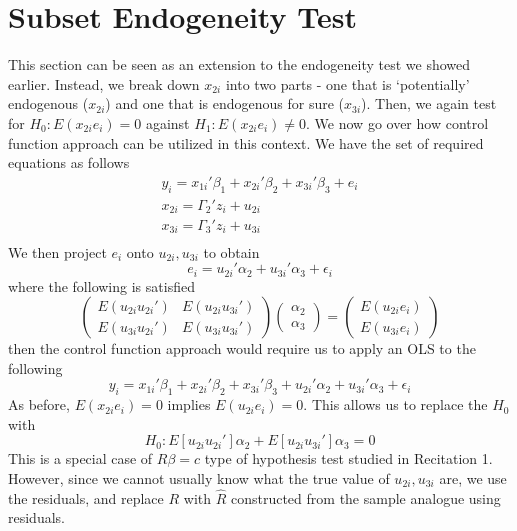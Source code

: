 \section{Subset Endogeneity Test}
This section can be seen as an extension to the endogeneity test we showed earlier. Instead, we break down $x_{2i}$ into two parts - one that is `potentially' endogenous ($x_{2i}$) and one that is endogenous for sure ($x_{3i}$). Then, we again test for  $H_0: E(x_{2i}e_i)=0$ against $H_1:E(x_{2i}e_i)\neq0$. We now go over how control function approach can be utilized in this context. We have the set of required equations as follows
\begin{gather*}
y_i = x_{1i}'\beta_1 + x_{2i}'\beta_2+x_{3i}'\beta_3+e_i \tag{Structural}\\
x_{2i}=\Gamma_{2}'z_{i}+u_{2i} \tag{Reduced Form 2}\\
x_{3i}=\Gamma_{3}'z_{i}+u_{3i} \tag{Reduced Form 3}\\
\end{gather*}
We then project $e_i$ onto $u_{2i}, u_{3i}$ to obtain
\[
e_i = u_{2i}'\alpha_2 + u_{3i}'\alpha_3 + \epsilon_i \tag{LP2}
\]
where the following is satisfied
\[
\begin{pmatrix}E(u_{2i}u_{2i}') & E(u_{2i}u_{3i}')\\E(u_{3i}u_{2i}') & E(u_{3i}u_{3i}')\end{pmatrix}\begin{pmatrix} \alpha_2 \\ \alpha_3\end{pmatrix} = \begin{pmatrix} E(u_{2i}e_i) \\ E(u_{3i}e_i)\end{pmatrix}
\]
then the control function approach would require us to apply an OLS to the following
\[
y_i = x_{1i}'\beta_1 + x_{2i}'\beta_2+x_{3i}'\beta_3+ u_{2i}'\alpha_2 + u_{3i}'\alpha_3 + \epsilon_i \tag{CFA2}
\]
As before, $E(x_{2i}e_i)=0$ implies $E(u_{2i}e_i)=0$. This allows us to replace the $H_0$ with
\[
H_0: E[u_{2i}u_{2i}']\alpha_2+E[u_{2i}u_{3i}']\alpha_3=0
\]
This is a special case of $R\beta=c$ type of hypothesis test studied in Recitation 1. However, since we cannot usually know what the true value of $u_{2i}, u_{3i}$ are, we use the residuals, and replace $R$ with $\widehat{R}$ constructed from the sample analogue using residuals. 
